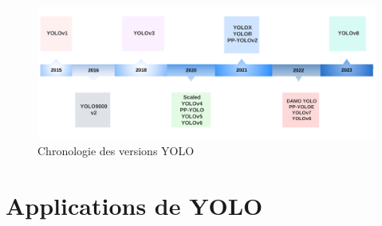 \documentclass{article}
\begin{document}
\begin{figure}[H]
    \centering
    \includegraphics[scale=0.22]{Figures/timeline.png}
    \caption{Chronologie des versions YOLO}
    \label{fig:time}
\end{figure}
\vspace{0.5cm}


\section{Applications de YOLO}
\end{document}
